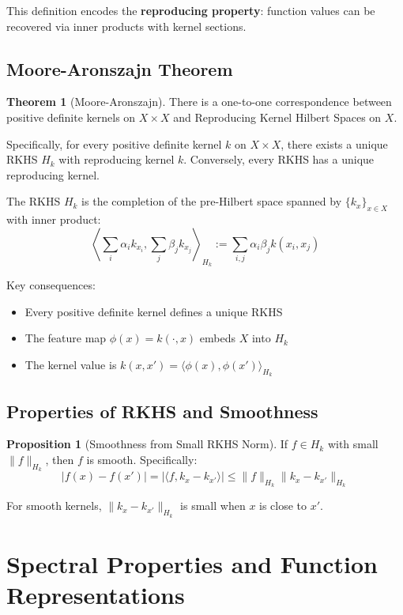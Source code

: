 \documentclass[12pt,a4paper]{article}
\theoremstyle{definition}
\newtheorem{theorem}{Theorem}[section]
\newtheorem{proposition}{Proposition}[section]
\begin{document}
This definition encodes the \textbf{reproducing property}: function values can be recovered via inner products with kernel sections.

\subsection{Moore-Aronszajn Theorem}

\begin{theorem}[Moore-Aronszajn]
There is a one-to-one correspondence between positive definite kernels on $X \times X$ and Reproducing Kernel Hilbert Spaces on $X$. 

Specifically, for every positive definite kernel $k$ on $X \times X$, there exists a unique RKHS $H_k$ with reproducing kernel $k$. Conversely, every RKHS has a unique reproducing kernel.

The RKHS $H_k$ is the completion of the pre-Hilbert space spanned by $\{k_x\}_{x \in X}$ with inner product:
\[
\left\langle \sum_i \alpha_i k_{x_i}, \sum_j \beta_j k_{x_j} \right\rangle_{H_k} := \sum_{i,j} \alpha_i \beta_j k(x_i, x_j)
\]
\end{theorem}

Key consequences:
\begin{itemize}
    \item Every positive definite kernel defines a unique RKHS
    \item The feature map $\phi(x) = k(\cdot, x)$ embeds $X$ into $H_k$
    \item The kernel value is $k(x, x') = \langle \phi(x), \phi(x') \rangle_{H_k}$
\end{itemize}

\subsection{Properties of RKHS and Smoothness}

\begin{proposition}[Smoothness from Small RKHS Norm]
If $f \in H_k$ with small $\|f\|_{H_k}$, then $f$ is smooth. Specifically:
\[
|f(x) - f(x')| = |\langle f, k_x - k_{x'} \rangle| \leq \|f\|_{H_k} \|k_x - k_{x'}\|_{H_k}
\]

For smooth kernels, $\|k_x - k_{x'}\|_{H_k}$ is small when $x$ is close to $x'$.
\end{proposition}

\section{Spectral Properties and Function Representations}
\end{document}
